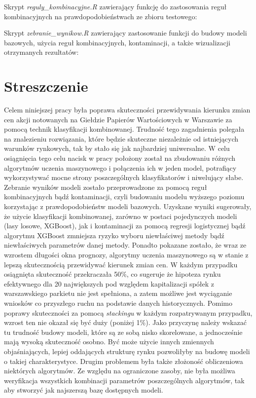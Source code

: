 \documentclass[12pt,a4paper,twoside,openany]{book}
\begin{document}
Skrypt \textit{reguly\_kombinacyjne.R} zawierający funkcję do zastosowania reguł kombinacyjnych na prawdopodobieństwach ze zbioru testowego:


Skrypt \textit{zebranie\_wynikow.R} zawierający zastosowanie funkcji do budowy modeli bazowych, użycia reguł kombinacyjnych, kontaminacji, a także wizualizacji otrzymanych rezultatów:


\clearpage

\chapter*{Streszczenie}

Celem niniejszej pracy była poprawa skuteczności przewidywania kierunku zmian cen akcji notowanych na Giełdzie Papierów Wartościowych w Warszawie za pomocą technik klasyfikacji kombinowanej. Trudność tego zagadnienia polegała na znalezieniu rozwiązania, które będzie skuteczne niezależnie od istniejących warunków rynkowych, tak by stało się jak najbardziej uniwersalne. W celu osiągnięcia tego celu nacisk w pracy położony został na zbudowaniu różnych algorytmów uczenia maszynowego i połączenia ich w jeden model, potrafiący wykorzystywać mocne strony poszczególnych klasyfikatorów i niwelujący słabe. Zebranie wyników modeli zostało przeprowadzone za pomocą reguł kombinacyjnych bądź kontaminacji, czyli budowaniu modelu wyższego poziomu korzystając z prawdopodobieństw modeli bazowych. Uzyskane wyniki sugerowały, że użycie klasyfikacji kombinowanej, zarówno w postaci pojedynczych modeli (lasy losowe, XGBoost), jak i kontaminacji za pomocą regresji logistycznej bądź algorytmu XGBoost zmniejsza ryzyko wyboru niewłaściwej metody bądź niewłaściwych parametrów danej metody. Ponadto pokazane zostało, że wraz ze wzrostem długości okna prognozy, algorytmy uczenia maszynowego są w stanie z lepszą skutecznością przewidywać kierunek zmian cen. W każdym przypadku osiągnięta skuteczność przekraczała 50\%, co sugeruje że hipoteza rynku efektywnego dla 20 największych pod względem kapitalizacji spółek z warszawskiego parkietu  nie jest spełniona, a zatem możliwe jest wyciąganie wniosków co przyszłego ruchu na podstawie danych historycznych. Pomimo poprawy skuteczności za pomocą \textit{stackingu} w każdym rozpatrywanym przypadku, wzrost ten nie okazał się być duży (poniżej 1\%). Jako przyczynę należy wskazać tu trudność budowy modeli, które są ze sobą nisko skorelowane, a jednocześnie mają wysoką skuteczność osobno. Być może użycie innych zmiennych objaśniających, lepiej oddających strukturę rynku pozwoliłyby na budowę modeli o takiej charakterystyce. Drugim problemem była także złożoność obliczeniowa niektórych algorytmów. Ze względu na ograniczone zasoby, nie była możliwa weryfikacja wszystkich kombinacji parametrów poszczególnych algorytmów, tak aby stworzyć jak najszerszą bazę dostępnych modeli.
\end{document}
